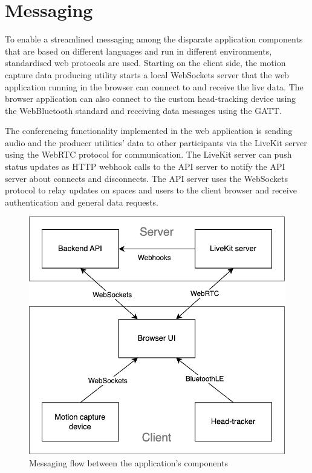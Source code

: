 \section{Messaging}

To enable a streamlined messaging among the disparate application components that are based on different languages and run in different environments, standardised web protocols are used. Starting on the client side, the motion capture data producing utility starts a local WebSockets server that the web application running in the browser can connect to and receive the live data. The browser application can also connect to the custom head-tracking device using the WebBluetooth standard and receiving data messages using the \ac{GATT}.

The conferencing functionality implemented in the web application is sending audio and the producer utilities' data to other participants via the LiveKit server using the WebRTC protocol for communication. The LiveKit server can push status updates as \ac{HTTP} webhook calls to the API server to notify the \ac{API} server about connects and disconnects. The \ac{API} server uses the WebSockets protocol to relay updates on spaces and users to the client browser and receive authentication and general data requests.

\begin{figure}[h]
\centering
\includegraphics[scale=0.4]{04_Artefakte/01_Abbildungen/application-messaging-flow}
\caption[Application messaging flow]{Messaging flow between the application's components\protect}
\label{fig:messagingFlow}
\end{figure}

